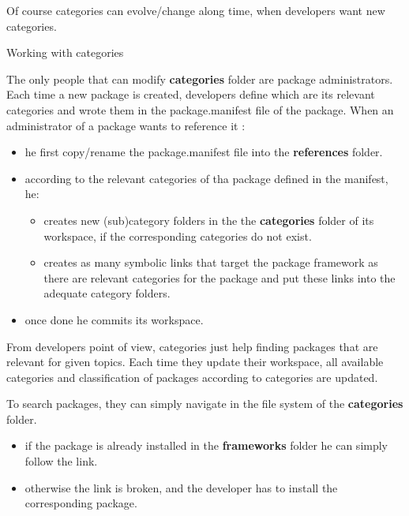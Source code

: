 \documentclass[12pt,a4paper]{article}
\begin{document}
Of course categories can evolve/change along time, when developers want new categories.

Working with categories

The only people that can modify \textbf{categories} folder are package administrators. Each time a new package is created, developers define which are its relevant categories and wrote them in the package.manifest file of the package. When an administrator of a package wants to reference it :
\begin{itemize}
\item he first copy/rename the package.manifest file into the \textbf{references} folder.
\item according to the relevant categories of tha package defined in the manifest, he:
\begin{itemize}
\item creates new (sub)category folders in the the \textbf{categories} folder of its workspace, if the corresponding categories do not exist.
\item creates as many symbolic links that target the package framework as there are relevant categories for the package and put these links into the adequate category folders.
\end{itemize}
\item once done he commits its workspace.
\end{itemize}

From developers point of view, categories just help finding packages that are relevant for given topics. Each time they update their workspace, all available categories and classification of packages according to categories are updated. 

To search packages, they can simply navigate in the file system of the \textbf{categories} folder. 
\begin{itemize}
\item if the package is already installed in the \textbf{frameworks} folder he can simply follow the link.
\item otherwise the link is broken, and the developer has to install the corresponding package.
\end{itemize}
\end{document}
